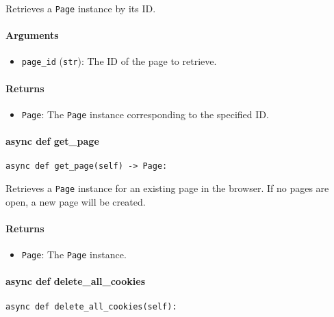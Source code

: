 \documentclass{article}
\begin{document}
\noindent Retrieves a \lstinline[style=pythonstyle]|Page| instance by its ID.

\paragraph{Arguments}

\begin{itemize}
    \item \lstinline[style=pythonstyle]|page_id| (\lstinline[style=pythonstyle]|str|): The ID of the page to retrieve.
\end{itemize}

\paragraph{Returns}

\begin{itemize}
    \item \lstinline[style=pythonstyle]|Page|: The \lstinline[style=pythonstyle]|Page| instance corresponding to the specified ID.
\end{itemize}

\paragraph{async def get\_page}

\begin{lstlisting}[style=pythonstyle]
async def get_page(self) -> Page:
\end{lstlisting}

\noindent Retrieves a \lstinline[style=pythonstyle]|Page| instance for an existing page in the browser. If no pages are open, a new page will be created.

\paragraph{Returns}

\begin{itemize}
    \item \lstinline[style=pythonstyle]|Page|: The \lstinline[style=pythonstyle]|Page| instance.
\end{itemize}

\paragraph{async def delete\_all\_cookies}

\begin{lstlisting}[style=pythonstyle]
async def delete_all_cookies(self):
\end{lstlisting}
\end{document}
